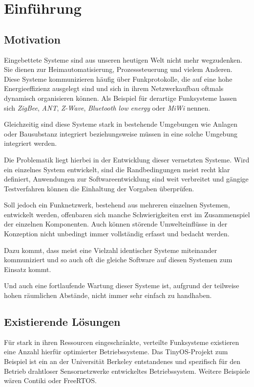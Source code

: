 \chapter{Einführung}
\adjustmtc
\minitoc
\section{Motivation}
Eingebettete Systeme sind aus unseren heutigen Welt nicht mehr wegzudenken. Sie
dienen zur Heimautomatisierung, Prozesssteuerung und vielem
Anderen. Diese Systeme kommunizieren häufig über Funkprotokolle, die auf eine
hohe Energieeffizienz ausgelegt sind und sich in ihrem Netzwerkaufbau oftmals
dynamisch organisieren können. Als Beispiel für derartige Funksysteme lassen
sich \emph{ZigBee}, \emph{ANT}, \emph{Z-Wave}, \emph{Bluetooth low energy} oder
\emph{MiWi} nennen.

Gleichzeitig sind diese Systeme stark in bestehende Umgebungen wie Anlagen oder
Bausubstanz integriert beziehungsweise müssen in eine solche Umgebung
integriert werden.

Die Problematik liegt hierbei in der Entwicklung dieser vernetzten Systeme. Wird
ein einzelnes System entwickelt, sind die Randbedingungen meist recht klar
definiert, Anwendungen zur Softwareentwicklung sind weit verbreitet und gängige
Testverfahren können die Einhaltung der Vorgaben überprüfen.

Soll jedoch ein Funknetzwerk, bestehend aus mehreren einzelnen Systemen,
entwickelt werden, offenbaren sich manche Schwierigkeiten erst im
Zusammenspiel der einzelnen Komponenten. Auch können störende
Umwelteinflüsse in der Konzeption nicht unbedingt immer vollständig erfasst und
bedacht werden.

Dazu kommt, dass meist eine Vielzahl identischer Systeme miteinander
kommuniziert und so auch oft die gleiche Software auf diesen Systemen zum
Einsatz kommt.

Und auch eine fortlaufende Wartung dieser Systeme ist, aufgrund der teilweise
hohen räumlichen Abstände, nicht immer sehr einfach zu handhaben. 

\section{Existierende Lösungen}\label{sec:exist}
Für stark in ihren Ressourcen eingeschränkte, verteilte Funksysteme existieren
eine Anzahl hierfür optimierter Betriebssysteme. Das TinyOS-Projekt\cite{TINY}
zum Beispiel ist ein an der Universität Berkeley entstandenes und spezifisch für
den Betrieb drahtloser Sensornetzwerke entwickeltes Betriebssystem. Weitere
Beispiele wären Contiki\cite{CONT} oder FreeRTOS\cite{FREE}.

